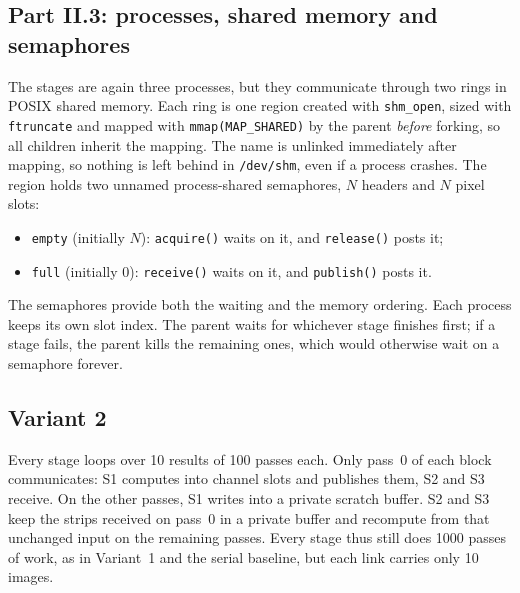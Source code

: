 \documentclass[11pt,a4paper]{article}
\newcommand{\cfgIterations}{1000}
\newcommand{\cfgPasses}{100}
\newcommand{\cfgResults}{10}
\newcommand{\code}[1]{\texttt{#1}}
\begin{document}
\subsection{Part II.3: processes, shared memory and semaphores}
The stages are again three processes, but they communicate through two rings in POSIX shared
memory. Each ring is one region created with \code{shm\_open}, sized with \code{ftruncate} and
mapped with \code{mmap(MAP\_SHARED)} by the parent \emph{before} forking, so all children
inherit the mapping. The name is unlinked immediately after mapping, so nothing is left behind in
\code{/dev/shm}, even if a process crashes. The region holds two unnamed process-shared
semaphores, $N$ headers and $N$ pixel slots:
\begin{itemize}
\item \code{empty} (initially $N$): \code{acquire()} waits on it, and \code{release()} posts it;
\item \code{full} (initially 0): \code{receive()} waits on it, and \code{publish()} posts it.
\end{itemize}
The semaphores provide both the waiting and the memory ordering. Each process keeps its own
slot index. The parent waits for whichever stage finishes first; if a stage fails, the parent
kills the remaining ones, which would otherwise wait on a semaphore forever.

\subsection{Variant 2}
Every stage loops over \cfgResults{} results of \cfgPasses{} passes each. Only pass~0 of each
block communicates: S1 computes into channel slots and publishes them, S2 and S3 receive. On the
other passes, S1 writes into a private scratch buffer. S2 and S3 keep the strips received on
pass~0 in a private buffer and recompute from that unchanged input on the remaining passes. Every
stage thus still does \cfgIterations{} passes of work, as in Variant~1 and the serial baseline,
but each link carries only \cfgResults{} images.
\end{document}
